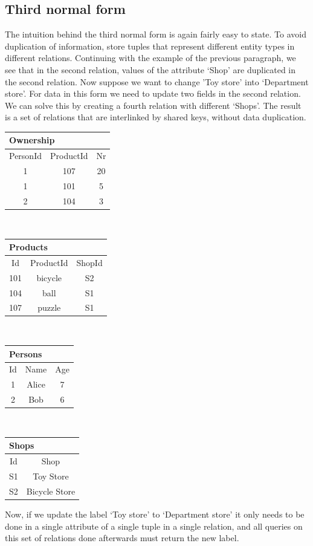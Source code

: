 \subsection{Third normal form}
The intuition behind the third normal form is again fairly easy to state.  To
avoid duplication of information, store tuples that represent different entity
types in different relations. Continuing with the example of the previous
paragraph, we see that in the second relation, values of the attribute `Shop'
are duplicated in the second relation. Now suppose we want to change 'Toy
store' into `Department store'. For data in this form we need to update two
fields in the second relation. We can solve this by creating a fourth relation
with different `Shops'.  The result is a set of relations that are interlinked
by shared keys, without data duplication.
%
\begin{center}
\begin{tabular}{|ccc|}
\multicolumn{3}{l}{Ownership}\\
\hline
PersonId & ProductId  & Nr   \\
\hline             
1  &   107   &20     \\
1  &   101   &5     \\
2  &   104   &3     \\
\hline
\end{tabular}
$\textrm{ }$\begin{tabular}{|ccc|}
\multicolumn{3}{l}{Products}\\
\hline
Id  & ProductId & ShopId         \\ 
\hline                       
101 & bicycle& S2     \\
104 & ball   & S1 \\
107 & puzzle & S1     \\
\hline
\end{tabular}$\textrm{ }$\begin{tabular}{|ccc|}
\multicolumn{3}{l}{Persons}\\
\hline
Id  & Name & Age \\ 
\hline
1 & Alice & 7\\
2 & Bob   & 6\\
\hline
\end{tabular}$\:\:$\begin{tabular}{|cc|}
\multicolumn{2}{l}{Shops}\\
\hline
Id  & Shop   \\ 
\hline
S1 & Toy Store \\
S2 & Bicycle Store\\
\hline
\end{tabular}
\end{center}
Now, if we update the label `Toy store' to `Department store' it only needs to
be done in a single attribute of a single tuple in a single relation, and all
queries on this set of relations done afterwards must return the new label.


